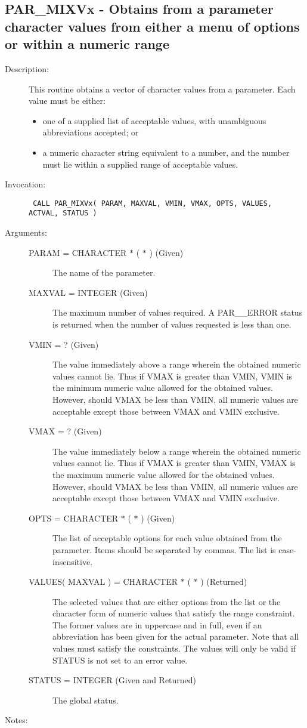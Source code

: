 \documentclass[twoside,11pt]{article}
\newcommand{\xlabel}[1]{}
\newlength{\sstbannerlength}
\newlength{\sstcaptionlength}
\newlength{\sstexampleslength}
\newlength{\sstexampleswidth}
\newcommand{\sstroutine}[3]{
   \goodbreak
   \rule{\textwidth}{0.5mm}
   \vspace{-7ex}
   \newline
   \settowidth{\sstbannerlength}{{\Large {\bf #1}}}
   \setlength{\sstcaptionlength}{\textwidth}
   \setlength{\sstexampleslength}{\textwidth}
   \addtolength{\sstbannerlength}{0.5em}
   \addtolength{\sstcaptionlength}{-2.0\sstbannerlength}
   \addtolength{\sstcaptionlength}{-5.0pt}
   \settowidth{\sstexampleswidth}{{\bf Examples:}}
   \addtolength{\sstexampleslength}{-\sstexampleswidth}
   \parbox[t]{\sstbannerlength}{\flushleft{\Large {\bf #1}}}
   \parbox[t]{\sstcaptionlength}{\center{\Large #2}}
   \parbox[t]{\sstbannerlength}{\flushright{\Large {\bf #1}}}
   \begin{description}
      #3
   \end{description}
}
\newcommand{\sstdescription}[1]{\item[Description:] #1}
\newcommand{\sstinvocation}[1]{\item[Invocation:]\hspace{0.4em}{\tt #1}}
\newcommand{\sstarguments}[1]{
   \item[Arguments:] \mbox{} \\
   \vspace{-3.5ex}
   \begin{description}
      #1
   \end{description}
}
\newcommand{\sstsubsection}[1]{ \item[{#1}] \mbox{} \\}
\newcommand{\sstnotes}[1]{\item[Notes:] \mbox{} \\[1.3ex] #1}
\newcommand{\sstitemlist}[1]{
  \mbox{} \\
  \vspace{-7ex}
  \begin{itemize}
     #1
  \end{itemize}
}
\newcommand{\ssttt}{\tt}
\renewcommand{\sstroutine}[3]{
      \subsection{\xlabel{12}#1\xlabel{#1}-\label{#1}#2}
      \begin{description}
         #3
      \end{description}
   }
\renewcommand{\sstdescription}[1]{\item[Description:]
      \begin{description}
         #1
      \end{description}
   }
\renewcommand{\sstinvocation}[1]{\item[Invocation:]
      \begin{description}
         {\ssttt #1}
      \end{description}
   }
\renewcommand{\sstarguments}[1]{
      \item[Arguments:]
      \begin{description}
         #1
      \end{description}
   }
\renewcommand{\sstsubsection}[1]{\item[{#1}]}
\renewcommand{\sstnotes}[1]{\item[Notes:]
      \begin{description}
         #1
      \end{description}
   }
\newcommand{\sstitemlist}[1]{
      \begin{itemize}
         #1
      \end{itemize}
   }
\begin{document}
\sstroutine{
   PAR\_MIXVx
}{
   Obtains from a parameter character values from either a menu of
   options or within a numeric range
}{
   \sstdescription{
      This routine obtains a vector of character values from a
      parameter.  Each value must be either:
         \begin{itemize}

         \item one of a supplied list of acceptable values, with
            unambiguous abbreviations accepted; or

         \item  a numeric character string equivalent to a number, and the
            number must lie within a supplied range of acceptable
            values.
         \end{itemize}
   }
   \sstinvocation{
      CALL PAR\_MIXVx( PARAM, MAXVAL, VMIN, VMAX, OPTS, VALUES, ACTVAL,
                      STATUS )
   }
   \sstarguments{
      \sstsubsection{
         PARAM = CHARACTER $*$ ( $*$ ) (Given)
      }{
         The name of the parameter.
      }
      \sstsubsection{
         MAXVAL = INTEGER (Given)
      }{
         The maximum number of values required.  A PAR\_\_ERROR status is
         returned when the number of values requested is less than one.
      }
      \sstsubsection{
         VMIN = ? (Given)
      }{
         The value immediately above a range wherein the obtained
         numeric values cannot lie.  Thus if VMAX is greater than VMIN,
         VMIN is the minimum numeric value allowed for the obtained
         values.  However, should VMAX be less than VMIN, all numeric
         values are acceptable except those between VMAX and VMIN
         exclusive.
      }
      \sstsubsection{
         VMAX = ? (Given)
      }{
         The value immediately below a range wherein the obtained
         numeric values cannot lie.  Thus if VMAX is greater than VMIN,
         VMAX is the maximum numeric value allowed for the obtained
         values.  However, should VMAX be less than VMIN, all numeric
         values are acceptable except those between VMAX and VMIN
         exclusive.
      }
      \sstsubsection{
         OPTS = CHARACTER $*$ ( $*$ ) (Given)
      }{
         The list of acceptable options for each value obtained from the
         parameter.  Items should be separated by commas.  The list is
         case-insensitive.
      }
      \sstsubsection{
         VALUES( MAXVAL ) = CHARACTER $*$ ( $*$ ) (Returned)
      }{
         The selected values that are either options from the list or
         the character form of numeric values that satisfy the range
         constraint.  The former values are in uppercase and in full,
         even if an abbreviation has been given for the actual
         parameter.  Note that all values must satisfy the constraints.
         The values will only be valid if STATUS is not set to an error
         value.
      }
      \sstsubsection{
         STATUS = INTEGER (Given and Returned)
      }{
         The global status.
      }
   }
   \sstnotes{
      \sstitemlist{

}}}
\end{document}
